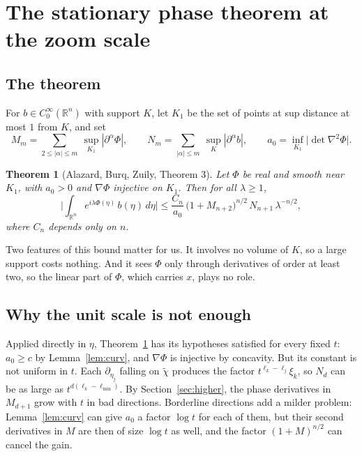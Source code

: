 \documentclass[11pt]{article}
\newtheorem{theorem}{Theorem}
\theoremstyle{remark}
\newcommand{\R}{\mathbb{R}}
\begin{document}
\section{The stationary phase theorem at the zoom scale}\label{sec:spt}

\subsection{The theorem}

For $b\in C_0^\infty(\R^n)$ with support $K$, let $K_1$ be the set of points at sup
distance at most $1$ from $K$, and set
\[
M_m=\sum_{2\le|\alpha|\le m}\ \sup_{K_1}|\partial^\alpha\Phi|,\qquad
N_m=\sum_{|\alpha|\le m}\ \sup_K|\partial^\alpha b|,\qquad
a_0=\inf_{K_1}\big|\det\nabla^2\Phi\big| .
\]

\begin{theorem}[Alazard, Burq, Zuily, Theorem 3]\label{thm:ABZ}
	Let $\Phi$ be real and smooth near $K_1$, with $a_0>0$ and $\nabla\Phi$ injective
	on $K_1$. Then for all $\lambda\ge1$,
	\[
	\Big|\int_{\R^n}e^{i\lambda\Phi(\eta)}\,b(\eta)\,d\eta\Big|
	\le\frac{C_n}{a_0}\,\big(1+M_{n+2}\big)^{n/2}\,N_{n+1}\,\lambda^{-n/2},
	\]
	where $C_n$ depends only on $n$.
\end{theorem}

Two features of this bound matter for us. It involves no volume of $K$, so a large
support costs nothing. And it sees $\Phi$ only through derivatives of order at
least two, so the linear part of $\Phi$, which carries $x$, plays no role.

\subsection{Why the unit scale is not enough}

Applied directly in $\eta$, Theorem~\ref{thm:ABZ} has its hypotheses satisfied for
every fixed $t$: $a_0\ge c$ by Lemma~\ref{lem:curv}, and $\nabla\Phi$ is injective by
concavity. But its constant is not uniform in $t$. Each $\partial_{\eta_j}$ falling
on $\tilde\chi$ produces the factor $t^{\ell_k-\ell_j}\xi_k$, so $N_d$ can be as large
as $t^{d(\ell_k-\ell_{\min})}$. By Section~\ref{sec:higher}, the phase derivatives in
$M_{d+1}$ grow with $t$ in bad directions. Borderline directions add a milder
problem: Lemma~\ref{lem:curv} can give $a_0$ a factor $\log t$ for each of them, but
their second derivatives in $M$ are then of size $\log t$ as well, and the factor
$(1+M)^{n/2}$ can cancel the gain.
\end{document}
